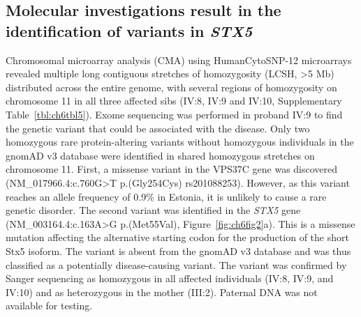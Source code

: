 \subsection{Molecular investigations result in the identification of variants in \emph{STX5}}

Chromosomal microarray analysis (CMA) using HumanCytoSNP-12 microarrays revealed multiple long contiguous stretches of homozygosity (LCSH, >5 Mb) distributed across the entire genome, with several regions of homozygosity on chromosome 11 in all three affected sibs (IV:8, IV:9 and IV:10, Supplementary Table~\ref{tbl:ch6tbl5}). Exome sequencing was performed in proband IV:9 to find the genetic variant that could be associated with the disease. Only two homozygous rare protein-altering variants without homozygous individuals in the gnomAD v3 database were identified in shared homozygous stretches on chromosome 11. First, a missense variant in the VPS37C gene was discovered (NM\_017966.4:c.760G>T p.(Gly254Cys) rs201088253). However, as this variant reaches an allele frequency of 0.9\% in Estonia, it is unlikely to cause a rare genetic disorder. The second variant was identified in the \emph{STX5} gene (NM\_003164.4:c.163A>G p.(Met55Val), Figure~\ref{fig:ch6fig2}a). This is a missense mutation affecting the alternative starting codon for the production of the short Stx5 isoform. The variant is absent from the gnomAD v3 database and was thus classified as a potentially disease-causing variant. The variant was confirmed by Sanger sequencing as homozygous in all affected individuals (IV:8, IV:9, and IV:10) and as heterozygous in the mother (III:2). Paternal DNA was not available for testing.

